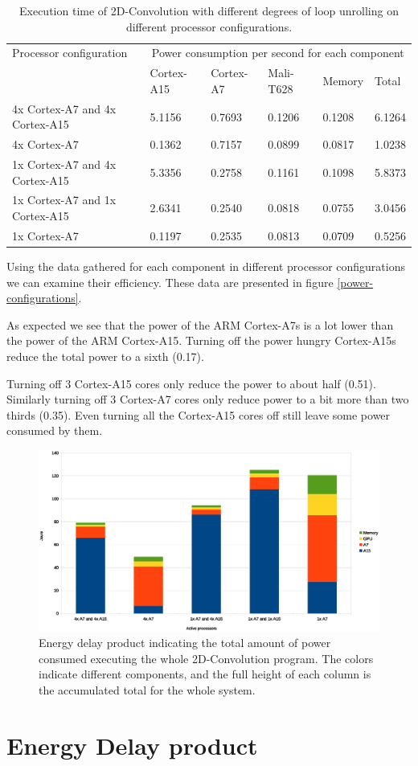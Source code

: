\begin{table}[H]
  \begin{tabular}{llllll}
    \toprule
    Processor configuration         & \multicolumn{5}{c}{Power consumption per second for each component} \\
                                    & Cortex-A15  & Cortex-A7 & Mali-T628 & Memory  & Total \\
    \midrule
    4x Cortex-A7 and 4x Cortex-A15  & 5.1156          & 0.7693        & 0.1206        & 0.1208  & 6.1264 \\
    4x Cortex-A7                    & 0.1362          & 0.7157        & 0.0899        & 0.0817  & 1.0238 \\
    1x Cortex-A7 and 4x Cortex-A15  & 5.3356          & 0.2758        & 0.1161        & 0.1098  & 5.8373 \\
    1x Cortex-A7 and 1x Cortex-A15  & 2.6341          & 0.2540        & 0.0818        & 0.0755  & 3.0456 \\
    1x Cortex-A7                    & 0.1197          & 0.2535        & 0.0813        & 0.0709  & 0.5256 \\
    \bottomrule
  \end{tabular}
  \caption{Execution time of 2D-Convolution with different degrees of loop unrolling on different processor configurations. \label{overflow}}
\end{table}
Using the data gathered for each component in different processor configurations we can examine their efficiency.
These data are presented in figure \ref{power-configurations}.

As expected we see that the power of the ARM Cortex-A7s is a lot lower than the power of the ARM Cortex-A15.
Turning off the power hungry Cortex-A15s reduce the total power to a sixth (0.17).

Turning off 3 Cortex-A15 cores only reduce the power to about half (0.51).
Similarly turning off 3 Cortex-A7 cores only reduce power to a bit more than two thirds (0.35).
Even turning all the Cortex-A15 cores off still leave some power consumed by them.


\begin{figure}[H]
  \centering
  \includegraphics[width=160mm]{fig/power-consumed-configurations.eps}
  \caption{Energy delay product indicating the total amount of power consumed executing the whole 2D-Convolution program. The colors indicate different components, and the full height of each column is the accumulated total for the whole system.\label{overflow}}
\end{figure}

\section{Energy Delay product}

